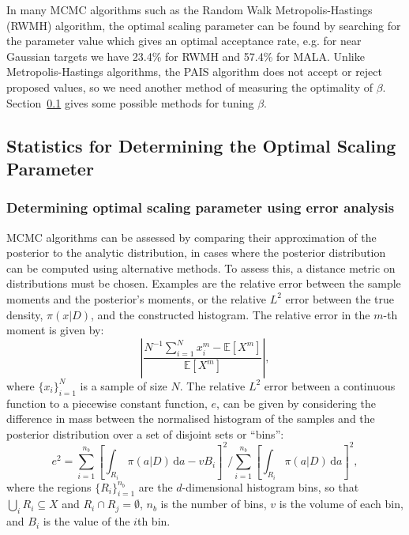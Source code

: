\documentclass[final]{siamltex}
\begin{document}
In many MCMC algorithms such as the Random Walk Metropolis-Hastings (RWMH) algorithm, the optimal scaling parameter can be found by searching for the parameter value which gives an optimal acceptance rate, e.g. for near Gaussian targets we have 23.4\% for RWMH and 57.4\% for MALA\cite{roberts2001optimal}. Unlike Metropolis-Hastings algorithms, the PAIS algorithm does not accept or reject proposed values, so we need another method of measuring the optimality of $\beta$. Section~\ref{sec:statistics} gives some possible methods for tuning $\beta$.

\subsection{Statistics for Determining the Optimal Scaling Parameter}\label{sec:statistics}

\subsubsection{Determining optimal scaling parameter using error analysis}

MCMC algorithms can be assessed by comparing their approximation of
the posterior to the analytic distribution, in cases where the
posterior distribution can be computed using alternative methods. To
assess this, a distance metric on distributions must be chosen. Examples are the
relative error between the sample moments and the posterior's moments, or the
relative $L^2$ error between the true density, $\pi(x|D)$, and the
constructed histogram. The relative error in the $m$-th moment is
given by:
\[
	\left|\frac{N^{-1}\sum_{i=1}^N \! x_i^m - \mathbb{E}[X^m]}{\mathbb{E}[X^m]}\right|,
\]
where $\{x_i\}_{i=1}^N$ is a sample of size $N$. The relative $L^2$
error between a continuous function to a piecewise constant function,
$e$, can be given by considering the difference in mass between the
normalised histogram of the samples and the posterior distribution
over a set of disjoint sets or ``bins'':
\begin{equation}\label{eqn:L2_error}
	e^2 = \sum\limits_{i=1}^{n_b}\left[\displaystyle\int_{R_i} \! \pi(a|D) \, \mbox{d}a - vB_i\right]^2 \Big/ \sum\limits_{i=1}^{n_b}\left[\displaystyle\int_{R_i} \! \pi(a|D) \, \mbox{d}a\right]^2,
\end{equation}
where the regions $\{R_i\}_{i=1}^{n_b}$ are the $d$-dimensional histogram bins, so that $\bigcup_i R_i \subseteq X$ and $R_i\cap R_j=\emptyset$, $n_b$ is the number of bins, $v$ is the volume of each bin, and $B_i$ is the value of the $i$th bin. 
\end{document}
